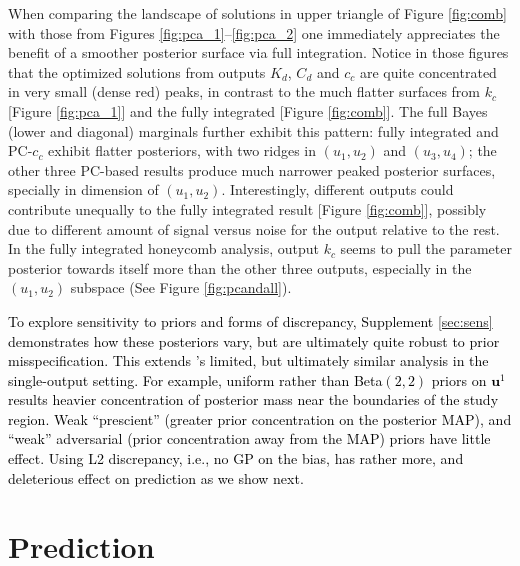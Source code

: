 \documentclass[12pt]{article}
\newcommand{\blunew}[1]{\textcolor{black}{#1}} %
\begin{document}
When comparing the landscape of solutions in upper triangle of Figure
\ref{fig:comb} with those from Figures \ref{fig:pca_1}--\ref{fig:pca_2} one
immediately appreciates the benefit of a smoother posterior surface via full
integration. Notice in those figures that the
optimized solutions from outputs $K_d$, $C_d$ and $c_c$ are quite concentrated
in very small (dense red)  peaks, in contrast to the much flatter surfaces
from $k_c$ [Figure \ref{fig:pca_1}] and the fully integrated [Figure
\ref{fig:comb}]. The full Bayes (lower and diagonal) marginals further exhibit
this pattern: fully integrated and PC-$c_c$ exhibit flatter posteriors, with
two ridges in $(u_1, u_2)$ and $(u_3, u_4)$; the other three PC-based results
produce much narrower peaked posterior surfaces, specially in dimension of
$(u_1, u_2)$. Interestingly,  different outputs could contribute 
unequally to the fully integrated result  [Figure \ref{fig:comb}], 
possibly due to different amount of signal versus noise for 
the output relative to the rest. In the fully integrated honeycomb analysis,  
output $k_c$ seems to pull the parameter posterior  towards itself more than
 the other three outputs, especially in the $(u_1, u_2)$ subspace (See Figure 
 \ref{fig:pcandall}).  

 \blunew{To explore sensitivity to priors and forms of discrepancy, 
 Supplement \ref{sec:sens} demonstrates how these posteriors vary, but are
 ultimately quite robust to prior misspecification.  This extends
 \citeauthor{Huang:2018}'s limited, but ultimately similar analysis in the
 single-output setting.  For example, uniform rather than Beta$(2,2)$ priors
 on $\mathbf{u}^1$ results heavier concentration of posterior mass near the
 boundaries of the study region.  Weak ``prescient'' (greater prior
 concentration on the posterior MAP), and ``weak'' adversarial (prior
 concentration away from the MAP) priors have little effect.  Using L2
 discrepancy, i.e., no GP on the bias, has rather more, and deleterious effect
 on prediction as we show next.}


\section{Prediction}
\label{sec:mpred}
\end{document}
